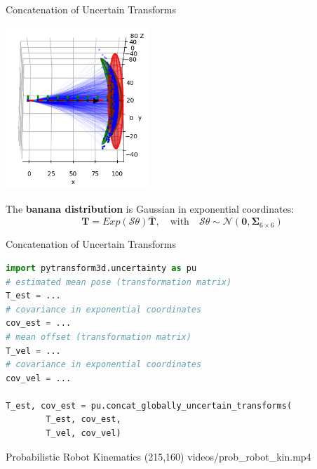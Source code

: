 \documentclass[14pt]{beamer}
\begin{document}
\begin{frame}[fragile]{Concatenation of Uncertain Transforms}
\begin{center}\includegraphics[width=0.4\textwidth]{images/state_estimation}\end{center}
\vskip -0.4cm
The \textbf{banana distribution} is Gaussian in exponential coordinates:
\[
\boldsymbol{T} = Exp(\mathcal{S}\theta) \overline{\boldsymbol{T}},\quad \textrm{with} \quad \mathcal{S}\theta \sim \mathcal{N}\left(\boldsymbol{0}, \boldsymbol{\Sigma}_{6 \times 6}\right)
\]
\parencite{Long2012,Barfoot2014}
\end{frame}

\begin{frame}[fragile]{Concatenation of Uncertain Transforms}
\begin{lstlisting}[language=Python]
import pytransform3d.uncertainty as pu
# estimated mean pose (transformation matrix)
T_est = ...
# covariance in exponential coordinates
cov_est = ...
# mean offset (transformation matrix)
T_vel = ...
# covariance in exponential coordinates
cov_vel = ...

T_est, cov_est = pu.concat_globally_uncertain_transforms(
        T_est, cov_est,
        T_vel, cov_vel)
\end{lstlisting}
\end{frame}

\begin{frame}[fragile]{Probabilistic Robot Kinematics}
\makebox(215,160){
{videos/prob_robot_kin.mp4}}%
\end{frame}
\end{document}
